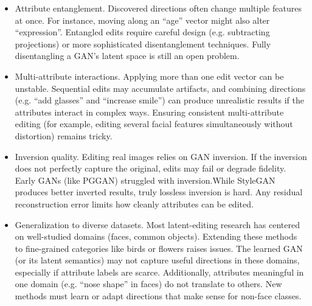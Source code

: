 \begin{itemize}
    \item Attribute entanglement. Discovered directions often change multiple features at once. For instance, moving along an “age” vector might also alter “expression”. Entangled edits require careful design (e.g. subtracting projections) or more sophisticated disentanglement techniques. Fully disentangling a GAN’s latent space is still an open problem.
    \item Multi-attribute interactions. Applying more than one edit vector can be unstable. Sequential edits may accumulate artifacts, and combining directions (e.g. “add glasses” and “increase smile”) can produce unrealistic results if the attributes interact in complex ways. Ensuring consistent multi-attribute editing (for example, editing several facial features simultaneously without distortion) remains tricky.
    \item Inversion quality. Editing real images relies on GAN inversion. If the inversion does not perfectly capture the original, edits may fail or degrade fidelity. Early GANs (like PGGAN) struggled with inversion.While StyleGAN produces better inverted results, truly lossless inversion is hard. Any residual reconstruction error limits how cleanly attributes can be edited.
    \item Generalization to diverse datasets. Most latent-editing research has centered on well-studied domains (faces, common objects). Extending these methods to fine-grained categories like birds or flowers raises issues. The learned GAN (or its latent semantics) may not capture useful directions in these domains, especially if attribute labels are scarce. Additionally, attributes meaningful in one domain (e.g. “nose shape” in faces) do not translate to others. New methods must learn or adapt directions that make sense for non-face classes.
\end{itemize}
